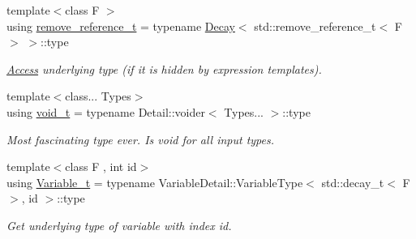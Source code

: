 \begin{DoxyCompactItemize}
{\footnotesize template$<$class F $>$ }\\using \hyperlink{namespaceFunG_a40f6d0896c1e3837d442d39418a4f609}{remove\+\_\+reference\+\_\+t} = typename \hyperlink{structFunG_1_1Decay}{Decay}$<$ std\+::remove\+\_\+reference\+\_\+t$<$ F $>$ $>$\+::type
\begin{DoxyCompactList}\small\item\em \hyperlink{namespaceFunG_1_1Access}{Access} underlying type (if it is hidden by expression templates). \end{DoxyCompactList}\item 
{\footnotesize template$<$class... Types$>$ }\\using \hyperlink{namespaceFunG_a0cde667596590eb8d32e4a5ee76ddbb9}{void\+\_\+t} = typename Detail\+::voider$<$ Types... $>$\+::type
\begin{DoxyCompactList}\small\item\em Most fascinating type ever. Is void for all input types. \end{DoxyCompactList}\item 
{\footnotesize template$<$class F , int id$>$ }\\using \hyperlink{namespaceFunG_a1c6fc5c4c7cd6678b9de8962c14b86b5}{Variable\+\_\+t} = typename Variable\+Detail\+::\+Variable\+Type$<$ std\+::decay\+\_\+t$<$ F $>$, id $>$\+::type
\begin{DoxyCompactList}\small\item\em Get underlying type of variable with index id. \end{DoxyCompactList}\end{DoxyCompactItemize}
